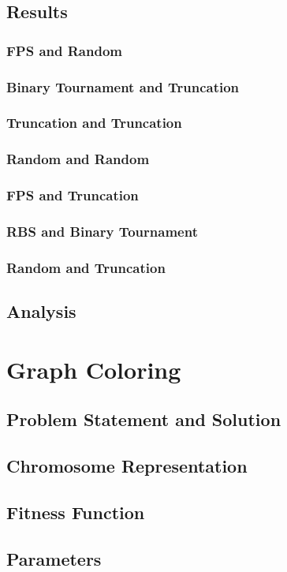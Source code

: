 \documentclass[12pt, letterpaper]{article}
\begin{document}
\subsection{Results} 
\subsubsection {FPS and Random}
\subsubsection {Binary Tournament and Truncation}
\subsubsection {Truncation and Truncation}
\subsubsection {Random and Random}
\subsubsection {FPS and Truncation}
\subsubsection {RBS and Binary Tournament}
\subsubsection {Random and Truncation}
\subsection{Analysis}

\section{Graph Coloring}
\subsection{Problem Statement and Solution}
\subsection{Chromosome Representation}
\subsection{Fitness Function}
\subsection{Parameters}
\end{document}
